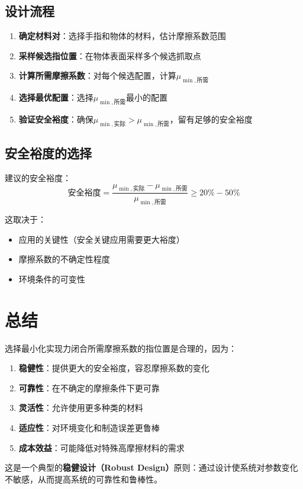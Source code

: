 \documentclass[12pt,a4paper]{article}
\begin{document}
\subsection{设计流程}

\begin{enumerate}
    \item \textbf{确定材料对}：选择手指和物体的材料，估计摩擦系数范围
    \item \textbf{采样候选指位置}：在物体表面采样多个候选抓取点
    \item \textbf{计算所需摩擦系数}：对每个候选配置，计算$\mu_{\min,\text{所需}}$
    \item \textbf{选择最优配置}：选择$\mu_{\min,\text{所需}}$最小的配置
    \item \textbf{验证安全裕度}：确保$\mu_{\min,\text{实际}} > \mu_{\min,\text{所需}}$，留有足够的安全裕度
\end{enumerate}

\subsection{安全裕度的选择}

建议的安全裕度：
\begin{equation}
\text{安全裕度} = \frac{\mu_{\min,\text{实际}} - \mu_{\min,\text{所需}}}{\mu_{\min,\text{所需}}} \geq 20\% - 50\%
\end{equation}

这取决于：
\begin{itemize}
    \item 应用的关键性（安全关键应用需要更大裕度）
    \item 摩擦系数的不确定性程度
    \item 环境条件的可变性
\end{itemize}

\section{总结}

选择最小化实现力闭合所需摩擦系数的指位置是合理的，因为：

\begin{enumerate}
    \item \textbf{稳健性}：提供更大的安全裕度，容忍摩擦系数的变化
    \item \textbf{可靠性}：在不确定的摩擦条件下更可靠
    \item \textbf{灵活性}：允许使用更多种类的材料
    \item \textbf{适应性}：对环境变化和制造误差更鲁棒
    \item \textbf{成本效益}：可能降低对特殊高摩擦材料的需求
\end{enumerate}

这是一个典型的\textbf{稳健设计（Robust Design）}原则：通过设计使系统对参数变化不敏感，从而提高系统的可靠性和鲁棒性。
\end{document}
